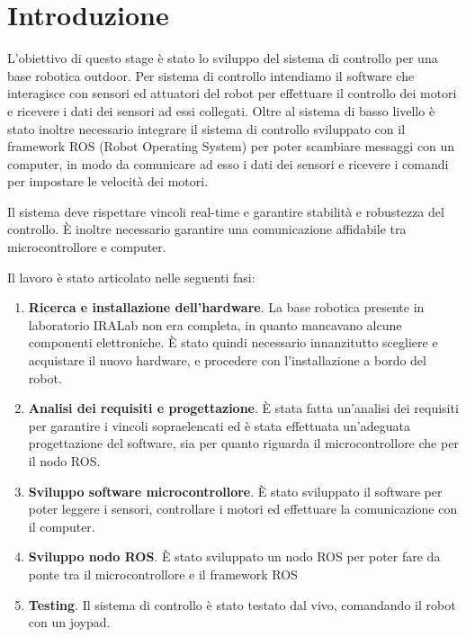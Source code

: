 \chapter{Introduzione}

L'obiettivo di questo stage è stato lo sviluppo del sistema di controllo per una base robotica outdoor. Per sistema di controllo intendiamo il software che interagisce con sensori ed attuatori del robot per effettuare il controllo dei motori e ricevere i dati dei sensori ad essi collegati. Oltre al sistema di basso livello è stato inoltre necessario integrare il sistema di controllo sviluppato con il framework ROS (Robot Operating System) per poter scambiare messaggi con un computer, in modo da comunicare ad esso i dati dei sensori e ricevere i comandi per impostare le velocità dei motori.

Il sistema deve rispettare vincoli real-time e garantire stabilità e robustezza del controllo. È inoltre necessario garantire una comunicazione affidabile tra microcontrollore e computer.

Il lavoro è stato articolato nelle seguenti fasi:

\begin{enumerate}
    \item \textbf{Ricerca e installazione dell'hardware}. La base robotica presente in laboratorio IRALab non era completa, in quanto mancavano alcune componenti elettroniche. È stato quindi necessario innanzitutto scegliere e acquistare il nuovo hardware, e procedere con l'installazione a bordo del robot.
    \item \textbf{Analisi dei requisiti e progettazione}. È stata fatta un'analisi dei requisiti per garantire i vincoli sopraelencati ed è stata effettuata un'adeguata progettazione del software, sia per quanto riguarda il microcontrollore che per il nodo ROS.
    \item \textbf{Sviluppo software microcontrollore}. È stato sviluppato il software per poter leggere i sensori, controllare i motori ed effettuare la comunicazione con il computer.
    \item \textbf{Sviluppo nodo ROS}. È stato sviluppato un nodo ROS per poter fare da ponte tra il microcontrollore e il framework ROS
    \item \textbf{Testing}. Il sistema di controllo è stato testato dal vivo, comandando il robot con un joypad.
\end{enumerate}
